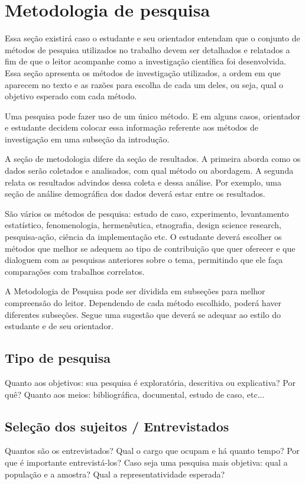 \chapter{Metodologia de pesquisa}\label{cap:metodologia}

Essa seção existirá caso o estudante e seu orientador entendam que o conjunto de métodos de pesquisa utilizados no trabalho devem ser detalhados e relatados a fim de que o leitor acompanhe como a investigação científica foi desenvolvida. Essa seção apresenta os métodos de investigação utilizados, a ordem em que aparecem no texto e as razões para escolha de cada um deles, ou seja, qual o objetivo esperado com cada método.

Uma pesquisa pode fazer uso de um único método. E em alguns casos, orientador e estudante decidem colocar essa informação referente aos métodos de investigação em uma subseção da introdução.

A seção de metodologia difere da seção de resultados. A primeira aborda como os dados serão coletados e analisados, com qual método ou abordagem. A segunda relata os resultados advindos dessa coleta e dessa análise. Por exemplo, uma seção de análise demográfica dos dados deverá estar entre os resultados. 

São vários os métodos de pesquisa: estudo de caso, experimento, levantamento estatístico, fenomenologia, hermenêutica, etnografia, design science research, pesquisa-ação, ciência da implementação etc. O estudante deverá escolher os métodos que melhor se adequem ao tipo de contribuição que quer oferecer e que dialoguem com as pesquisas anteriores sobre o tema, permitindo que ele faça comparações com trabalhos correlatos. 

A Metodologia de Pesquisa pode ser dividida em subseções para melhor compreensão do leitor. Dependendo de cada método escolhido, poderá haver diferentes subseções. Segue uma sugestão que deverá se adequar ao estilo do estudante e de seu orientador.

\section{Tipo de pesquisa}
Quanto aos objetivos: sua pesquisa é exploratória, descritiva ou explicativa? Por quê?
Quanto aos meios: bibliográfica, documental, estudo de caso, etc... 

\section{Seleção dos sujeitos / Entrevistados}
Quantos são os entrevistados? Qual o cargo que ocupam e há quanto tempo? Por que é importante entrevistá-los?
Caso seja uma pesquisa mais objetiva: qual a população e a amostra? Qual a representatividade esperada?

